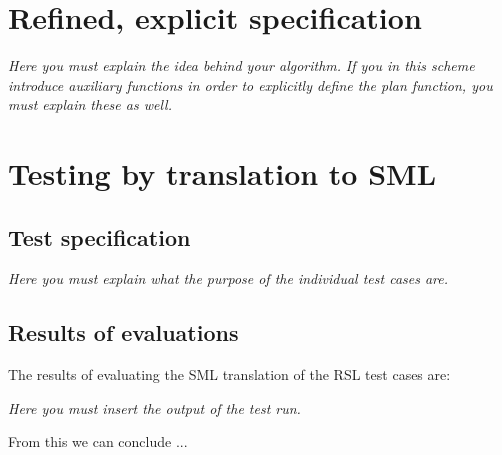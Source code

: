 \documentclass[a4]{article}
\begin{document}
\section{Refined, explicit specification}

  

{\em Here you must  explain the idea behind your algorithm.}
{\em If you in this scheme introduce auxiliary functions in order to explicitly
  define the plan function, you must explain these as well.}

\section{Testing by translation to SML}

\subsection{Test specification}


        
{\em Here you must  explain what the purpose of the individual test
  cases are.}


\subsection{Results of evaluations}


The results of evaluating the SML translation of the RSL test cases are:

{\em Here you must  insert the output of the test run.}



\noindent From this we can conclude ...
\end{document}
